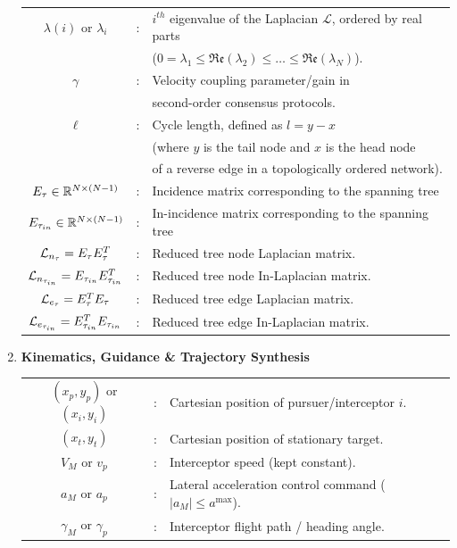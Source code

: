 \begin{enumerate}
\begin{tabular}{cll}
            $\lambda(i)$ or $\lambda_i$ &:& $i^{th}$ eigenvalue of the Laplacian $\mathcal{L}$, ordered by real parts \\
            & & ($0 = \lambda_1 \le \mathfrak{Re}(\lambda_2) \le \dots \le \mathfrak{Re}(\lambda_N)$). \\
            $\gamma$ &:& Velocity coupling parameter/gain in \\
            & & second-order consensus protocols.\\
            $\ell$ &:& Cycle length, defined as $l = y - x$ \\
            & & (where $y$ is the tail node and $x$ is the head node \\
            & & of a reverse edge in a topologically ordered network).\\
            $\etree \in \R^{N \times (N-1)}$ &:& Incidence matrix corresponding to the spanning tree \\ %
            $\etreein \in \R^{N \times (N-1)}$ &:&  In-incidence matrix corresponding to the spanning tree \\ %
            $\lntree = \etree\etree^T$ &:&  Reduced tree node Laplacian matrix. \\
            $\lntreein = \etreein\etreein^T$ &:&  Reduced tree node In-Laplacian matrix. \\
            $\letree = \etree^T\etree$ &:&  Reduced tree edge Laplacian matrix. \\
            $\letreein = \etreein^T\etreein$ &:&  Reduced tree edge In-Laplacian matrix. \\       
    \end{tabular}
    \item {\bf Kinematics, Guidance \& Trajectory Synthesis}\\
        \begin{tabular}{cll}
        $(x_p, y_p)$ or $(x_i, y_i)$ &:& Cartesian position of pursuer/interceptor $i$.\\
        $(x_t, y_t)$ &:& Cartesian position of stationary target.\\
        $V_M$ or $v_p$ &:& Interceptor speed (kept constant).\\
        $a_M$ or $a_p$ &:& Lateral acceleration control command ($\vert{}a_M\vert{} \le a^{\text{max}}$).\\
        $\gamma_M$ or $\gamma_p$ &:& Interceptor flight path / heading angle.\\

\end{tabular}
\end{enumerate}
